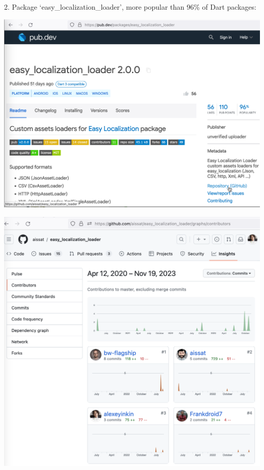 2. Package `easy\_localization\_loader', more popular than 96\% of Dart packages:

\begin{center}
    \includegraphics[width=\textwidth]{easy_localization_loader}
\end{center}
\begin{center}
    \includegraphics[width=\textwidth]{easy_localization_loader_contributors}
\end{center}
\pagebreak

